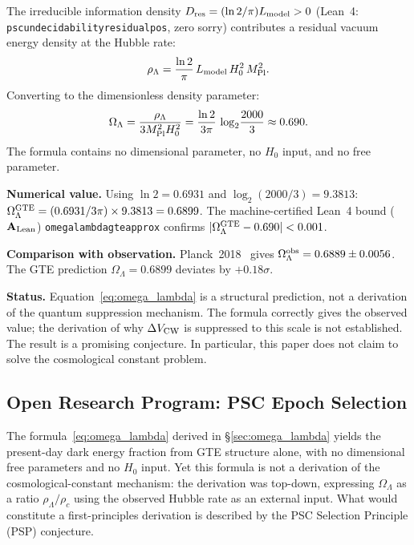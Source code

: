 \documentclass[11pt]{article}
\theoremstyle{remark}
\newcommand{\lean}[1]{%
  \penalty-100
  \begingroup\def\_{\textunderscore\allowbreak}\texttt{#1}\endgroup}
\newcommand{\MPl}{M_{\rm Pl}}
\newcommand{\Omegalam}{\Omega_\Lambda}
\newcommand{\Dres}{D_{\rm res}}
\newcommand{\CatAL}{\ensuremath{\textbf{A}_{\rm Lean}}}
\begin{document}
The irreducible information density $\Dres = (\ln 2/\pi) L_{\rm model} > 0$ (Lean~4:
\lean{psc\_undecidability\_residual\_pos}, zero sorry) contributes a residual vacuum
energy density at the Hubble rate:
\begin{equation}
  \rho_\Lambda = \frac{\ln 2}{\pi}\,L_{\rm model}\,H_0^2\,\MPl^2.
\end{equation}
Converting to the dimensionless density parameter:
\begin{equation}
  \Omegalam = \frac{\rho_\Lambda}{3\MPl^2 H_0^2}
            = \frac{\ln 2}{3\pi}\,\log_2\!\frac{2000}{3}
            \approx 0.690.
  \label{eq:omega_lambda}
\end{equation}
The formula contains no dimensional parameter, no $H_0$ input, and no free parameter.

\smallskip\noindent\textbf{Numerical value.}  Using $\ln 2 = 0.6931$ and
$\log_2(2000/3) = 9.3813$: $\Omegalam^{\rm GTE} = (0.6931/3\pi)\times 9.3813 = 0.6899$.
The machine-certified Lean~4 bound ($\CatAL$)
\lean{omega\_lambda\_gte\_approx} confirms $|\Omegalam^{\rm GTE}-0.690|<0.001$.

\smallskip\noindent\textbf{Comparison with observation.}  Planck~2018~\cite{Planck2018}
gives $\Omegalam^{\rm obs} = 0.6889\pm0.0056$.  The GTE prediction $\Omegalam = 0.6899$
deviates by $+0.18\sigma$.

\smallskip\noindent\textbf{Status.}  Equation~\eqref{eq:omega_lambda} is a structural
prediction, not a derivation of the quantum suppression mechanism.  The formula correctly
gives the observed value; the derivation of why $\Delta V_{\rm CW}$ is suppressed to
this scale is not established.  The result is a promising conjecture.  In particular,
this paper does not claim to solve the cosmological constant problem.

\subsection{Open Research Program: PSC Epoch Selection}
\label{sec:psp}

The formula~\eqref{eq:omega_lambda} derived in \S\ref{sec:omega_lambda} yields the
present-day dark energy fraction from GTE structure alone, with no dimensional free
parameters and no $H_0$ input.  Yet this formula is not a derivation of the
cosmological-constant mechanism: the derivation was top-down, expressing $\Omegalam$ as
a ratio $\rho_\Lambda/\rho_c$ using the observed Hubble rate as an external input.
What would constitute a first-principles derivation is described by the PSC Selection
Principle (PSP) conjecture.
\end{document}
